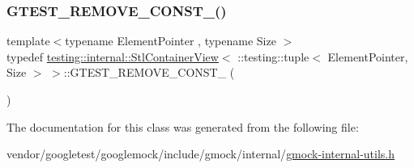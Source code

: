 \mbox{\label{classtesting_1_1internal_1_1_stl_container_view_3_01_1_1testing_1_1tuple_3_01_element_pointer_00_01_size_01_4_01_4_a2b1dd06842cb431ef647b85707ce52ff}} 
\subsubsection{\texorpdfstring{G\+T\+E\+S\+T\+\_\+\+R\+E\+M\+O\+V\+E\+\_\+\+C\+O\+N\+S\+T\+\_\+()}{GTEST\_REMOVE\_CONST\_()}}
{\footnotesize\ttfamily template$<$typename Element\+Pointer , typename Size $>$ \\
typedef \hyperlink{classtesting_1_1internal_1_1_stl_container_view}{testing\+::internal\+::\+Stl\+Container\+View}$<$ \+::testing\+::tuple$<$ Element\+Pointer, Size $>$ $>$\+::G\+T\+E\+S\+T\+\_\+\+R\+E\+M\+O\+V\+E\+\_\+\+C\+O\+N\+S\+T\+\_\+ (\begin{DoxyParamCaption}\item[{typename \hyperlink{structtesting_1_1internal_1_1_pointee_of}{internal\+::\+Pointee\+Of}$<$ Element\+Pointer $>$\+::\hyperlink{classtesting_1_1internal_1_1_stl_container_view_3_01_1_1testing_1_1tuple_3_01_element_pointer_00_01_size_01_4_01_4_aedefb897170f76518afbca6f87b5467c}{type}}]{ }\end{DoxyParamCaption})}



The documentation for this class was generated from the following file\+:\begin{DoxyCompactItemize}
\item 
vendor/googletest/googlemock/include/gmock/internal/\hyperlink{gmock-internal-utils_8h}{gmock-\/internal-\/utils.\+h}\end{DoxyCompactItemize}
